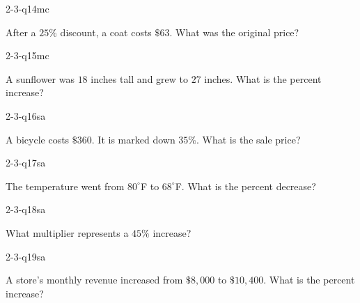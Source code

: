 \begin{practiceQuestion}{2-3-q14}{mc}
\begin{questionText}
After a $25\%$ discount, a coat costs $\$63$. What was the original price?
\end{questionText}
\end{practiceQuestion}

\begin{practiceQuestion}{2-3-q15}{mc}
\begin{questionText}
A sunflower was $18$ inches tall and grew to $27$ inches. What is the percent increase?
\end{questionText}
\end{practiceQuestion}


\begin{practiceQuestion}{2-3-q16}{sa}
\begin{questionText}
A bicycle costs $\$360$. It is marked down $35\%$. What is the sale price?
\end{questionText}
\end{practiceQuestion}

\begin{practiceQuestion}{2-3-q17}{sa}
\begin{questionText}
The temperature went from $80^\circ$F to $68^\circ$F. What is the percent decrease?
\end{questionText}
\end{practiceQuestion}

\begin{practiceQuestion}{2-3-q18}{sa}
\begin{questionText}
What multiplier represents a $45\%$ increase?
\end{questionText}
\end{practiceQuestion}

\begin{practiceQuestion}{2-3-q19}{sa}
\begin{questionText}
A store's monthly revenue increased from $\$8{,}000$ to $\$10{,}400$. What is the percent increase?
\end{questionText}
\end{practiceQuestion}

